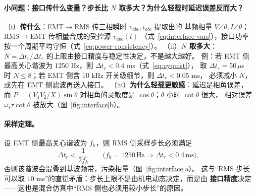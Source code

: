 \paragraph{小问题：接口传什么变量？步长比 $N$ 取多大？为什么轻载时延迟误差反而大？}
（i）\textbf{传什么}：EMT$\to$RMS 传三相瞬时 $v_{abc},i_{abc}$ 提取出的
基频相量 $V\angle\theta,I\angle\theta$；RMS$\to$EMT 传相量合成的受控源 $v_{abc}(t)$
（式~\eqref{eq:interface-vars}），接口功率按一个周期平均守恒（式~\eqref{eq:power-consistency}）。
（ii）\textbf{$N$ 取多大}：$N=\Delta t_r/\Delta t_e$ 的上限由接口精度与稳定性决定，不是越大越好。
例：若 EMT 侧最高关心谐波为 $1250$ Hz，则 $\Delta t_r<0.4$ ms（式~\eqref{eq:nyquist}），
取 $\Delta t_e=50\,\mu$s 时 $N\le8$；若 EMT 侧含 $10$ kHz 开关级细节，则 $\Delta t_r<0.05$ ms，
必须减小 $N$，或先在 EMT 侧滤波再送入接口。
（iii）\textbf{为什么轻载更敏感}：延迟是相角误差，而 $P=(V_1V_2/X)\sin\theta$
对相角的灵敏度是 $\cos\theta$；$\theta$ 小时 $\cot\theta$ 很大，
相对误差 $\omega_s\tau\cot\theta$ 被放大（图~\ref{fig:interface}b）。

\paragraph{采样定理。} 设 EMT 侧最高关心谐波为 $f_h$，则 RMS 侧采样步长必须满足
\begin{equation}
\Delta t_r<\frac{1}{2f_h}
\qquad\bigl(f_h=1250\,\text{Hz}\Rightarrow \Delta t_r<0.4\,\text{ms}\bigr),
\label{eq:nyquist}
\end{equation}
否则该谐波会混叠到基波频带，污染相量（图~\ref{fig:interface}a）。
这与“RMS 步长可以取 $10$ ms”的直觉矛盾：步长上限不是由机电动态决定，而是由
\textbf{接口精度}决定——这也是混合仿真中“RMS 侧也必须用较小步长”的原因。

